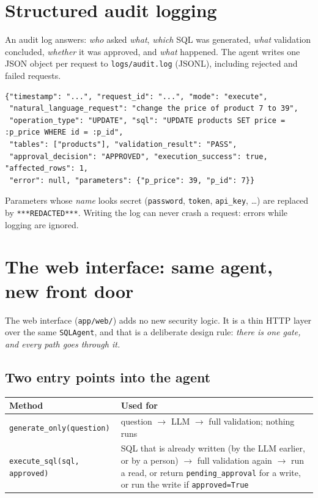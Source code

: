 \documentclass[11pt,a4paper]{article}
\begin{document}
\section{Structured audit logging}

An audit log answers: \emph{who} asked \emph{what}, \emph{which} SQL was
generated, \emph{what} validation concluded, \emph{whether} it was approved,
and \emph{what} happened. The agent writes one JSON object per request to
\texttt{logs/audit.log} (JSONL), including rejected and failed requests.

\begin{lstlisting}
{"timestamp": "...", "request_id": "...", "mode": "execute",
 "natural_language_request": "change the price of product 7 to 39",
 "operation_type": "UPDATE", "sql": "UPDATE products SET price = :p_price WHERE id = :p_id",
 "tables": ["products"], "validation_result": "PASS",
 "approval_decision": "APPROVED", "execution_success": true, "affected_rows": 1,
 "error": null, "parameters": {"p_price": 39, "p_id": 7}}
\end{lstlisting}

Parameters whose \emph{name} looks secret (\texttt{password}, \texttt{token},
\texttt{api\_key}, \dots) are replaced by \texttt{***REDACTED***}.
Writing the log can never crash a request: errors while logging are ignored.

\section{The web interface: same agent, new front door}
\label{sec:web}

The web interface (\texttt{app/web/}) adds no new security logic. It is a
thin HTTP layer over the same \texttt{SQLAgent}, and that is a deliberate
design rule: \emph{there is one gate, and every path goes through it.}

\subsection*{Two entry points into the agent}
\begin{center}
\begin{tabular}{@{}p{4.9cm}p{9.5cm}@{}}
\toprule
\textbf{Method} & \textbf{Used for} \\
\midrule
\texttt{generate\_only(question)} & question $\rightarrow$ LLM $\rightarrow$ full validation; nothing runs \\
\texttt{execute\_sql(sql, approved)} & SQL that is already written (by the LLM earlier, or by a person) $\rightarrow$ full validation again $\rightarrow$ run a read, or return \texttt{pending\_approval} for a write, or run the write if \texttt{approved=True} \\
\bottomrule
\end{tabular}
\end{center}
\end{document}
